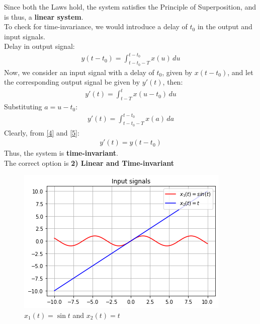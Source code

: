 \documentclass[journal,12pt,twocolumn]{IEEEtran}
\begin{document}
Since both the Laws hold, the system satisfies the Principle of Superposition, and is thus, a \textbf{linear system}.\\

To check for time-invariance, we would introduce a delay of $t_0$ in the output and input signals.\\
Delay in output signal:
\begin{align}
    y(t-t_0) = \int_{t-t_0-T}^{t-t_0} x(u)\,du
    \label{4}
\end{align}
Now, we consider an input signal with a delay of $t_0$, given by $x(t-t_0)$, and let the corresponding output signal be given by $y'(t)$, then:
\begin{align}
    y'(t) = \int_{t-T}^{t} x(u-t_0)\,du
\end{align}
Substituting $a = u-t_0$:
\begin{align}
    y'(t) = \int_{t-t_0-T}^{t-t_0} x(a)\,da
    \label{5}
\end{align}
Clearly, from \eqref{4} and \eqref{5}:
\begin{align}
    y'(t) = y(t-t_0)
\end{align}
Thus, the system is \textbf{time-invariant}.\\
The correct option is \textbf{2) Linear and Time-invariant}
\begin{figure}[!ht]
\centering
 \includegraphics[width=\columnwidth]{graphs/input_signals.png}
 \caption{$x_1(t) = \sin{t}$ and $x_2(t) = t$}
 \end{figure}
\end{document}
